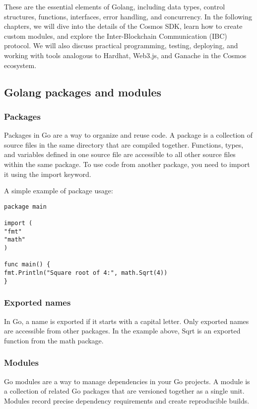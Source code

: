 \documentclass{article}
\begin{document}
These are the essential elements of Golang, including data types, control structures, functions, interfaces, error handling, and concurrency. In the following chapters, we will dive into the details of the Cosmos SDK, learn how to create custom modules, and explore the Inter-Blockchain Communication (IBC) protocol. We will also discuss practical programming, testing, deploying, and working with tools analogous to Hardhat, Web3.js, and Ganache in the Cosmos ecosystem.

\subsection{Golang packages and modules}

\subsubsection{Packages}

Packages in Go are a way to organize and reuse code. A package is a collection of source files in the same directory that are compiled together. Functions, types, and variables defined in one source file are accessible to all other source files within the same package. To use code from another package, you need to import it using the import keyword.

A simple example of package usage:

\begin{verbatim}
package main

import (
"fmt"
"math"
)

func main() {
fmt.Println("Square root of 4:", math.Sqrt(4))
}
\end{verbatim}

\subsubsection{Exported names}

In Go, a name is exported if it starts with a capital letter. Only exported names are accessible from other packages. In the example above, Sqrt is an exported function from the math package.

\subsubsection{Modules}

Go modules are a way to manage dependencies in your Go projects. A module is a collection of related Go packages that are versioned together as a single unit. Modules record precise dependency requirements and create reproducible builds.
\end{document}
